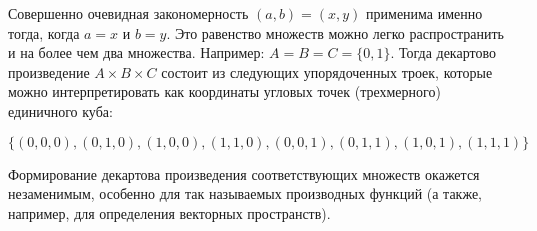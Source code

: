 Совершенно очевидная закономерность \((a,b)=(x,y)\) применима именно тогда, когда \(a=x\) и \(b=y\). Это равенство множеств можно легко распространить и на более чем два множества. Например: \(A=B=C=\{0,1\}\). Тогда декартово произведение \(A \times B \times C\) состоит из следующих упорядоченных троек, которые можно интерпретировать как координаты угловых точек (трехмерного) единичного куба:

\vspace{0.5cm}
\(\{(0,0,0),(0,1,0),(1,0,0),(1,1,0),(0,0,1),(0,1,1),(1,0,1),(1,1,1)\}\)

\vspace{0.5cm}
Формирование декартова произведения соответствующих множеств окажется незаменимым, особенно для так называемых производных функций (а также, например, для определения векторных пространств).